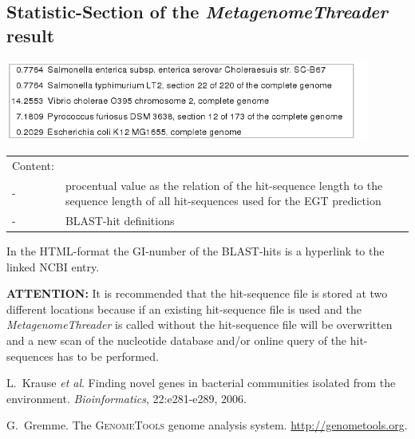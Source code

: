 \documentclass[12pt,titlepage]{article}
\newcommand{\MetagenomeThreader}{\textit{MetagenomeThreader}\xspace}
\newcommand{\Attention}{\textbf{ATTENTION:}\xspace}
\begin{document}
\subsection{Statistic-Section of the \MetagenomeThreader result}

\includegraphics[height=2.64cm, width=12.01cm]{mgthgraphics/statistic_mg.jpg}

\begin{tabular}{p{}p{14cm}}
Content:
\\
- &procentual value as the relation of the hit-sequence length
to the sequence length of all hit-sequences used for the EGT prediction
\\
- &BLAST-hit definitions
\end{tabular}

In the HTML-format the GI-number of the BLAST-hits is a hyperlink to the
linked NCBI entry.

\Attention It is recommended that the hit-sequence file is stored at two
different locations because if an existing hit-sequence file is used and
the \MetagenomeThreader is called without   the hit-sequence file
will be overwritten and a new scan of the nucleotide database and/or online query of the
hit-sequences has to be performed.

%
%
\begin{thebibliography}{1}

L.~Krause \textit{et al}.
\newblock Finding novel genes in bacterial communities isolated
from the environment. \textit{Bioinformatics}, 22:e281-e289, 2006.

G.~Gremme.
\newblock The \textsc{GenomeTools} genome analysis system.
  \url{http://genometools.org}.

\end{thebibliography}
\end{document}
